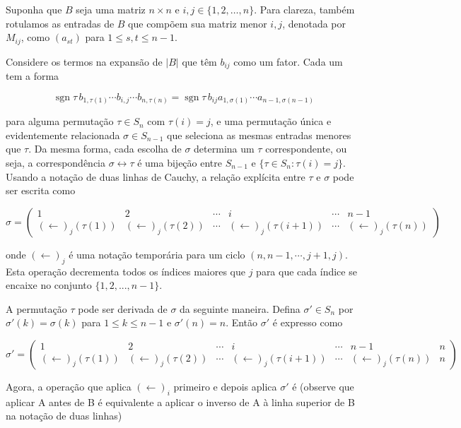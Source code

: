Suponha que $B$ seja uma matriz $n \times n$ e $i,j \in \{1,2,\dots ,n\}$. Para clareza, também rotulamos as entradas de $B$ que compõem sua matriz menor $i,j$, denotada por $M_{ij}$, como $(a_{st})$ para $1 \leq s,t \leq n-1$.

Considere os termos na expansão de $|B|$ que têm $b_{ij}$ como um fator. Cada um tem a forma

$$\operatorname{sgn} \tau \, b_{1,\tau (1)}\cdots b_{i,j}\cdots b_{n,\tau (n)} = \operatorname{sgn} \tau \, b_{ij} a_{1,\sigma (1)}\cdots a_{n-1,\sigma (n-1)}$$

para alguma permutação $\tau \in S_n$ com $\tau (i) = j$, e uma permutação única e evidentemente relacionada $\sigma \in S_{n-1}$ que seleciona as mesmas entradas menores que $\tau$. Da mesma forma, cada escolha de $\sigma$ determina um $\tau$ correspondente, ou seja, a correspondência $\sigma \leftrightarrow \tau$ é uma bijeção entre $S_{n-1}$ e $\{\tau \in S_{n}: \tau (i) = j\}$. Usando a notação de duas linhas de Cauchy, a relação explícita entre $\tau$ e $\sigma$ pode ser escrita como

$$\sigma = \begin{pmatrix} 1 & 2 & \cdots & i & \cdots & n-1 \\ (\leftarrow )_{j}(\tau (1)) & (\leftarrow )_{j}(\tau (2)) & \cdots & (\leftarrow )_{j}(\tau (i+1)) & \cdots & (\leftarrow )_{j}(\tau (n)) \end{pmatrix}$$

onde $(\leftarrow )_{j}$ é uma notação temporária para um ciclo $(n,n-1,\cdots ,j+1,j)$. Esta operação decrementa todos os índices maiores que $j$ para que cada índice se encaixe no conjunto $\{1,2,...,n-1\}$.

A permutação $\tau$ pode ser derivada de $\sigma$ da seguinte maneira. Defina $\sigma' \in S_{n}$ por $\sigma' (k) = \sigma (k)$ para $1 \leq k \leq n-1$ e $\sigma' (n) = n$. Então $\sigma'$ é expresso como

$$\sigma' = \begin{pmatrix} 1 & 2 & \cdots & i & \cdots & n-1 & n \\ (\leftarrow )_{j}(\tau (1)) & (\leftarrow )_{j}(\tau (2)) & \cdots & (\leftarrow )_{j}(\tau (i+1)) & \cdots & (\leftarrow )_{j}(\tau (n)) & n \end{pmatrix}$$

Agora, a operação que aplica $(\leftarrow )_{i}$ primeiro e depois aplica $\sigma'$ é (observe que aplicar A antes de B é equivalente a aplicar o inverso de A à linha superior de B na notação de duas linhas)

